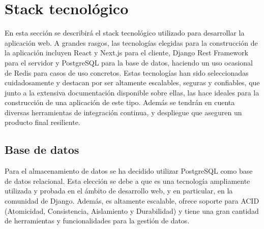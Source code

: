 
\section{Stack tecnológico}\label{sec:stack-tecnologico}

En esta sección se describirá el stack tecnológico utilizado para desarrollar la aplicación web. A grandes rasgos, las tecnologías elegidas para la construcción de la aplicación incluyen React y Next.js para el cliente, Django Rest Framework para el servidor y PostgreSQL para la base de datos, haciendo un uso ocasional de Redis para casos de uso concretos. Estas tecnologías han sido seleccionadas cuidadosamente y destacan por ser altamente escalables, seguras y confiables, que junto a la extensiva documentación disponible sobre ellas, las hace ideales para la construcción de una aplicación de este tipo. Además se tendrán en cuenta diversas herramientas de integración continua,  y despliegue que aseguren un producto final resiliente.

\subsection{Base de datos}

Para el almacenamiento de datos se ha decidido utilizar PostgreSQL como base de datos relacional. Esta elección se debe a que es una tecnología ampliamente utilizada y probada en el ámbito de desarrollo web, y en particular, en la comunidad de Django. Además, es altamente escalable, ofrece soporte para ACID (Atomicidad, Consistencia, Aislamiento y Durabilidad) y tiene una gran cantidad de herramientas y funcionalidades para la gestión de datos.


